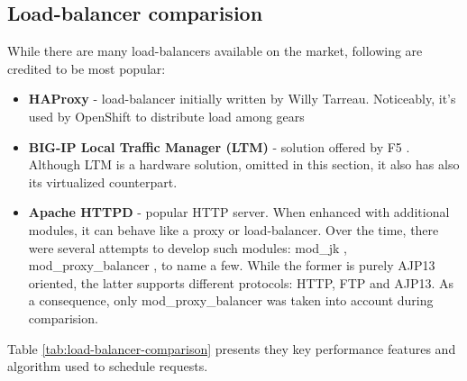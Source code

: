 \subsection{Load-balancer comparision}

While there are many load-balancers available on the market, following are credited to be most popular:
\begin{itemize}
 \item \textbf{HAProxy} \cite{HAProxy} - load-balancer initially written by Willy Tarreau. Noticeably, it's used by OpenShift \cite{OpenShift} to distribute load among gears \cite{OpenShiftScaling}
 \item \textbf{BIG-IP Local Traffic Manager (LTM)} - solution offered by F5 \cite{F5}. Although LTM is a hardware solution, omitted in this section, it also has also its virtualized counterpart.
 \item \textbf{Apache HTTPD} \cite{ApacheHTTPD} - popular HTTP server. When enhanced with additional modules, it can behave like a proxy or load-balancer. Over the time, there were several attempts to develop such modules: mod\_jk \cite{ApacheModJk}, mod\_proxy\_balancer \cite{ApacheModProxyBalancer}, to name a few. While the former is purely AJP13 oriented, the latter supports different protocols: HTTP, FTP and AJP13. As a consequence, only mod\_proxy\_balancer was taken into account during comparision.
\end{itemize}

Table \ref{tab:load-balancer-comparison} presents they key performance features and algorithm used to schedule requests.

